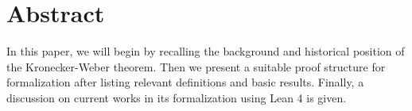 \thispagestyle{plain} %



\chapter*{Abstract} %
In this paper, we will begin by recalling the background and historical position of the Kronecker-Weber theorem. Then we present a suitable proof structure for formalization after listing relevant definitions and basic results. Finally, a discussion on current works in its formalization using Lean 4 is given.




